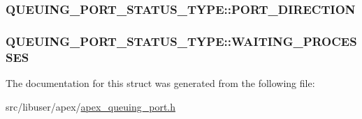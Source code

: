 \subsubsection[{\texorpdfstring{P\+O\+R\+T\+\_\+\+D\+I\+R\+E\+C\+T\+I\+ON}{PORT_DIRECTION}}]{ Q\+U\+E\+U\+I\+N\+G\+\_\+\+P\+O\+R\+T\+\_\+\+S\+T\+A\+T\+U\+S\+\_\+\+T\+Y\+P\+E\+::\+P\+O\+R\+T\+\_\+\+D\+I\+R\+E\+C\+T\+I\+ON}\hypertarget{structQUEUING__PORT__STATUS__TYPE_af3d8b40327cd03b1397e441441408738}{}\label{structQUEUING__PORT__STATUS__TYPE_af3d8b40327cd03b1397e441441408738}
\subsubsection[{\texorpdfstring{W\+A\+I\+T\+I\+N\+G\+\_\+\+P\+R\+O\+C\+E\+S\+S\+ES}{WAITING_PROCESSES}}]{ Q\+U\+E\+U\+I\+N\+G\+\_\+\+P\+O\+R\+T\+\_\+\+S\+T\+A\+T\+U\+S\+\_\+\+T\+Y\+P\+E\+::\+W\+A\+I\+T\+I\+N\+G\+\_\+\+P\+R\+O\+C\+E\+S\+S\+ES}\hypertarget{structQUEUING__PORT__STATUS__TYPE_a4b68d92cd2d0481a18ba44cfeb6f9e44}{}\label{structQUEUING__PORT__STATUS__TYPE_a4b68d92cd2d0481a18ba44cfeb6f9e44}


The documentation for this struct was generated from the following file\+:\begin{DoxyCompactItemize}
\item 
src/libuser/apex/\hyperlink{apex__queuing__port_8h}{apex\+\_\+queuing\+\_\+port.\+h}\end{DoxyCompactItemize}
